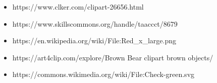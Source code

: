 \documentclass[xcolor=dvipsnames]{beamer}
\begin{document}
    \appendix
    \begin{frame}[plain]
        \begin{itemize}
            \item https://www.clker.com/clipart-26656.html \\
            \item https://www.skillscommons.org/handle/taaccct/8679 \\
            \item https://en.wikipedia.org/wiki/File:Red\_x\_large.png \\
            \item https://art4clip.com/explore/Brown Bear clipart brown objects/ \\
            \item https://commons.wikimedia.org/wiki/File:Check-green.svg \\ %
        \end{itemize}
    \end{frame}
\end{document}
